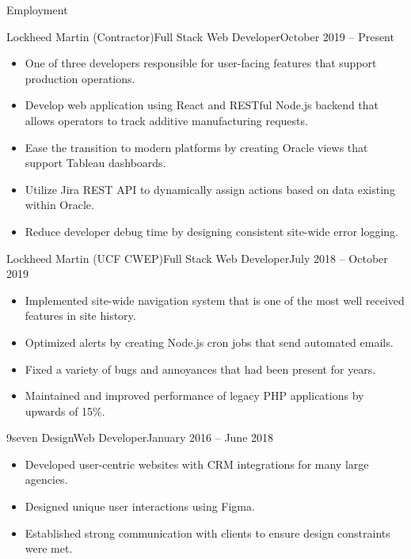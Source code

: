 \documentclass[calibri]{mcdowellcv}
\begin{document}
	\makeheader
	
	\begin{cvsection}{Employment}
		\begin{cvsubsection}{Lockheed Martin (Contractor)}{Full Stack Web Developer}{October 2019 -- Present}		
			\begin{itemize}
				\item One of three developers responsible for user-facing features that support production operations.
				\item Develop web application using React and RESTful Node.js backend that allows operators to track additive manufacturing requests.
				\item Ease the transition to modern platforms by creating Oracle views that support Tableau dashboards.
				\item Utilize Jira REST API to dynamically assign actions based on data existing within Oracle.
				\item Reduce developer debug time by designing consistent site-wide error logging.
			\end{itemize}
		\end{cvsubsection}
		
		\begin{cvsubsection}{Lockheed Martin (UCF CWEP)}{Full Stack Web Developer}{July 2018 -- October 2019}	
			\begin{itemize}
				\item Implemented site-wide navigation system that is one of the most well received features in site history.
				\item Optimized alerts by creating Node.js cron jobs that send automated emails.
				\item Fixed a variety of bugs and annoyances that had been present for years.
				\item Maintained and improved performance of legacy PHP applications by upwards of 15\%.
			\end{itemize}
		\end{cvsubsection}
		
		\begin{cvsubsection}{9seven Design}{Web Developer}{January 2016 -- June 2018}		
			\begin{itemize}
				\item Developed user-centric websites with CRM integrations for many large agencies.
				\item Designed unique user interactions using Figma.
				\item Established strong communication with clients to ensure design constraints were met.
			\end{itemize}
		\end{cvsubsection}
	\end{cvsection}
	
\end{document}
